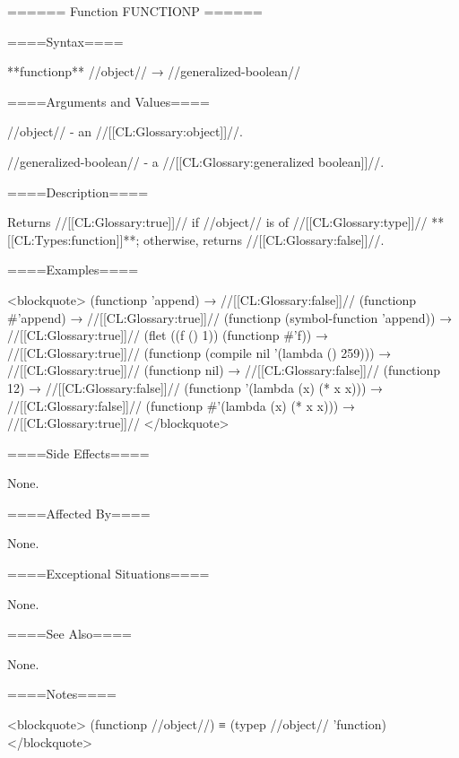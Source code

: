 ====== Function FUNCTIONP ======

====Syntax====

**functionp** //object// → //generalized-boolean//

====Arguments and Values====

//object// - an //[[CL:Glossary:object]]//.

//generalized-boolean// - a //[[CL:Glossary:generalized boolean]]//.

====Description====

Returns //[[CL:Glossary:true]]// if //object// is of //[[CL:Glossary:type]]// **[[CL:Types:function]]**; otherwise, returns //[[CL:Glossary:false]]//.

====Examples====

<blockquote> (functionp 'append) → //[[CL:Glossary:false]]// (functionp #'append) → //[[CL:Glossary:true]]// (functionp (symbol-function 'append)) → //[[CL:Glossary:true]]// (flet ((f () 1)) (functionp #'f)) → //[[CL:Glossary:true]]// (functionp (compile nil '(lambda () 259))) → //[[CL:Glossary:true]]// (functionp nil) → //[[CL:Glossary:false]]// (functionp 12) → //[[CL:Glossary:false]]// (functionp '(lambda (x) (* x x))) → //[[CL:Glossary:false]]// (functionp #'(lambda (x) (* x x))) → //[[CL:Glossary:true]]// </blockquote>

====Side Effects====

None.

====Affected By====

None.

====Exceptional Situations====

None.

====See Also====

None.

====Notes====

<blockquote> (functionp //object//) ≡ (typep //object// 'function) </blockquote>


